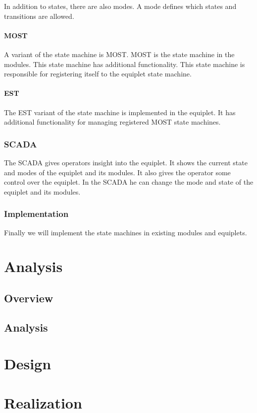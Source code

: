\documentclass[12pt,a4paper]{report}
\begin{document}
In addition to states, there are also modes.
A mode defines which states and transitions are allowed.

\subsubsection{MOST}
A variant of the state machine is MOST.
MOST is the state machine in the modules.
This state machine has additional functionality.
This state machine is responsible for registering itself to the equiplet state machine.

\subsubsection{EST}
The EST variant of the state machine is implemented in the equiplet.
It has additional functionality for managing registered MOST state machines.

\subsection{SCADA}
The SCADA gives operators insight into the equiplet.
It shows the current state and modes of the equiplet and its modules.
It also gives the operator some control over the equiplet.
In the SCADA he can change the mode and state of the equiplet and its modules.

\subsection{Implementation}
Finally we will implement the state machines in existing modules and equiplets.

\chapter{Analysis}
\section{Overview}

\section{Analysis}

\chapter{Design}

\chapter{Realization}
\end{document}
